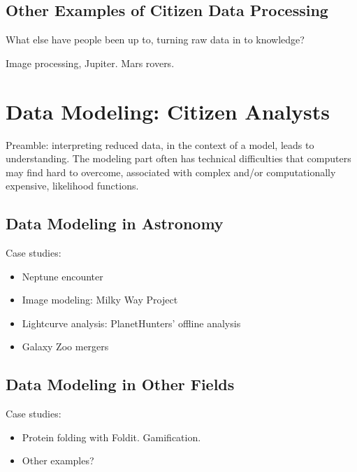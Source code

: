\documentclass{ar2e}
\begin{document}
\subsection{Other Examples of Citizen Data Processing}
\label{sec:classifiers:non-sensory}

What else have people been up to, turning raw data in to knowledge?

Image processing, Jupiter. Mars rovers.



\section{Data Modeling: Citizen Analysts}
\label{sec:modelers}

Preamble: interpreting reduced data, in the context of a model, leads to
understanding. The modeling part often has technical difficulties that computers
may find hard to overcome, associated with complex and/or computationally
expensive, likelihood functions.



\subsection{Data Modeling in Astronomy}
\label{sec:modelers:astro}

Case studies:
\begin{itemize}
\item Neptune encounter
\item Image modeling: Milky Way Project
\item Lightcurve analysis: PlanetHunters' offline analysis
\item Galaxy Zoo mergers
\end{itemize}



\subsection{Data Modeling in Other Fields}
\label{sec:modelers:astro}

Case studies:
\begin{itemize}
\item Protein folding with Foldit. Gamification.
\item Other examples? 
\end{itemize}
\end{document}
